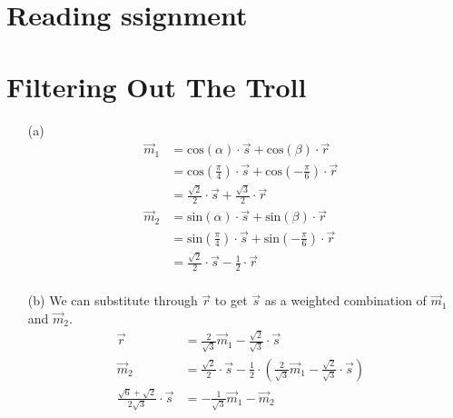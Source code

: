 \documentclass[10pt,a4paper]{article}
\begin{document}
\section{Reading ssignment}
\section{Filtering Out The Troll}
\begin{itemize}
  \item[(a)]
    \begin{align*}
      \vec{m}_{1} &= \text{cos}(\alpha) \cdot \vec{s} + \text{cos}(\beta) \cdot \vec{r}&\\
      &= \text{cos}(\frac{\pi}{4}) \cdot \vec{s} + \text{cos}(-\frac{\pi}{6}) \cdot \vec{r}&\\
      &= \frac{\sqrt{2}}{2} \cdot \vec{s} + \frac{\sqrt{3}}{2} \cdot \vec{r}&\\
      \vec{m}_{2} &= \text{sin}(\alpha) \cdot \vec{s} + \text{sin}(\beta) \cdot \vec{r}& \\
      &= \text{sin}(\frac{\pi}{4}) \cdot \vec{s} + \text{sin}(-\frac{\pi}{6}) \cdot \vec{r}&\\
      &= \frac{\sqrt{2}}{2} \cdot \vec{s} - \frac{1}{2} \cdot \vec{r}&\\
    \end{align*}
  \item[(b)] We can substitute through $\vec{r}$ to get $\vec{s}$ as a weighted combination of $\vec{m}_1$ and $\vec{m}_2$.
    \begin{align*}
      \vec{r} &= \frac{2}{\sqrt{3}}\vec{m}_{1} - \frac{\sqrt{2}}{\sqrt{3}} \cdot \vec{s}& \\
      \vec{m}_{2} &= \frac{\sqrt{2}}{2} \cdot \vec{s} - \frac{1}{2} \cdot (\frac{2}{\sqrt{3}}\vec{m}_{1} - \frac{\sqrt{2}}{\sqrt{3}} \cdot \vec{s})& \\
      \frac{\sqrt{6}+\sqrt{2}}{2\sqrt{3}} \cdot \vec{s} &= -\frac{1}{\sqrt{3}}\vec{m}_{1} - \vec{m}_{2}&
    \end{align*}
\end{itemize}
\end{document}
